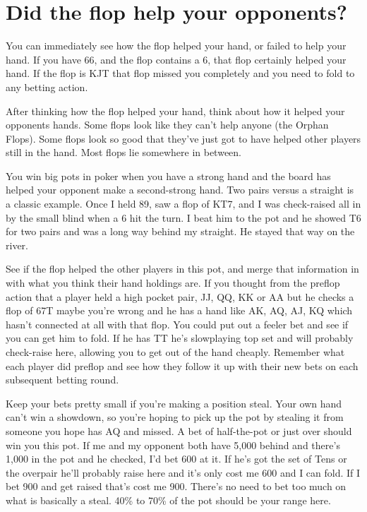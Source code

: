 \section{Did the flop help your opponents?}

You can immediately see how the flop helped your hand, or failed
to help your hand. If you have 66, and the flop contains
a 6, that flop certainly helped your hand. If the flop is KJT that
flop missed you completely and you need to fold to any betting action.

After thinking how the flop helped your hand, think about how
it helped your opponents hands. Some flops look like they can't
help anyone (the Orphan Flops). Some flops look so
good that they've just got to have helped other players still in
the hand. Most flops lie somewhere in between.

You win big pots in poker when you have a strong hand and the board
has helped your opponent make a second-strong hand. Two pairs
versus a straight is a classic example. Once I held 89, saw a flop
of KT7, and I was check-raised all in by the small blind when a 6 hit
the turn. I beat him to the pot and he showed T6 for two pairs and
was a long way behind my straight. He stayed that way on the river.

See if the flop helped the other players in this pot, and merge
that information in with what you think their hand holdings are.
If you thought from the preflop action that a player held a high
pocket pair, JJ, QQ, KK or AA but he checks a flop of 67T maybe
you're wrong and he has a hand like AK, AQ, AJ, KQ which hasn't connected
at all with that flop. You could put out a feeler bet and see if
you can get him to fold. If he has TT he's slowplaying top set and
will probably check-raise here, allowing you to get out of the hand
cheaply. Remember what each player did preflop and see how they
follow it up with their new bets on each subsequent betting round.

Keep your bets pretty small if you're making a position steal. Your own
hand can't win a showdown, so you're hoping to pick up the pot
by stealing it from someone you hope has AQ and missed. A bet
of half-the-pot or just over should win you this pot. If me and
my opponent both have 5,000 behind and there's 1,000 in the pot
and he checked, I'd bet 600 at it. If he's got the set of Tens or
the overpair he'll probably raise here and it's only cost me 600
and I can fold. If I bet 900 and get raised that's
cost me 900. There's no need to bet too much on what is basically
a steal. 40\% to 70\% of the pot should be your range here.


